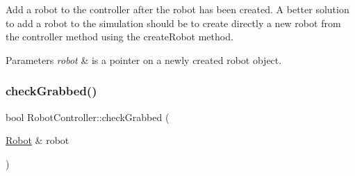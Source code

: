 Add a robot to the controller after the robot has been created. A better solution to add a robot to the simulation should be to create directly a new robot from the controller method using the create\+Robot method. 
\begin{DoxyParams}{Parameters}
{\em robot} & is a pointer on a newly created robot object. \\
\hline
\end{DoxyParams}
\mbox{\label{class_robot_controller_a69372797c97d6f9212dc63d2b35b4932}} 
\subsubsection{\texorpdfstring{check\+Grabbed()}{checkGrabbed()}}
{\footnotesize\ttfamily bool Robot\+Controller\+::check\+Grabbed (\begin{DoxyParamCaption}\item[{\mbox{\hyperlink{class_robot}{Robot}} \&}]{robot }\end{DoxyParamCaption})}

